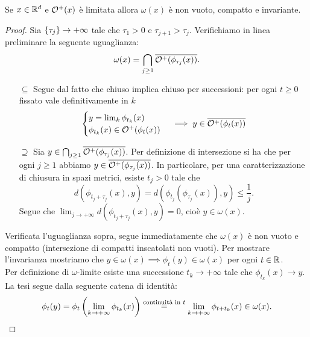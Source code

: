 \begin{proposition}\label{OrbitaPositivaLimitataImplicaCompattezzaEInvarianzaOmegaLimite}
Se $x\in\mathbb{R}^d$ e $\mathcal{O}^+(x)$ \`e limitata allora $\omega(x)$ \`e non vuoto, compatto e invariante.
\end{proposition}
\begin{proof}
Sia $\left\{{\tau_j}\right\}\to+\infty$ tale che $\tau_1>0$ e $\tau_{j+1}>\tau_j$. 
Verifichiamo in linea preliminare la seguente uguaglianza:
\[\omega(x)=\bigcap_{j\geq 1}\overline{\mathcal{O}^+(\phi_{\tau_j}(x))}.\]
\setlength{\leftmargini}{0cm}  
\begin{itemize}
\item[$\boxed{\subseteq}$] Segue dal fatto che chiuso implica chiuso per successioni: per ogni $t\geq 0$ fissato vale definitivamente in $k$
\[\begin{cases}
y=\lim_k\phi_{t_k}(x)\\
\phi_{t_k}(x)\in \mathcal{O}^+(\phi_t(x))
\end{cases}\implies y\in \overline{\mathcal{O}^+(\phi_t(x))}\]
\item[$\boxed{\supseteq}$] Sia $y\in \bigcap_{j\geq 1}\overline{\mathcal{O}^+(\phi_{\tau_j}(x))}$. Per definizione di intersezione si ha che per ogni $j\geq 1$ abbiamo $y\in\overline{\mathcal{O}^+(\phi_{\tau_j}(x))}$. In particolare, per una caratterizzazione di chiusura in spazi metrici, esiste $t_j>0$ tale che
\[d(\phi_{t_j+\tau_j}(x),y)=d(\phi_{t_j}(\phi_{\tau_j}(x)),y)\leq \frac1j.\]
Segue che $\displaystyle\lim_{j\to+\infty}d(\phi_{t_j+\tau_j}(x),y)=0$, cio\`e $y\in \omega(x)$.
\end{itemize}
Verificata l'uguaglianza sopra, segue immediatamente che $\omega(x)$ \`e non vuoto e compatto (intersezione di compatti inscatolati non vuoti). Per mostrare l'invarianza mostriamo che $y\in\omega(x)\implies \phi_t(y)\in\omega(x)$ per ogni $t\in\mathbb{R}$.\\
Per definizione di $\omega$-limite esiste una successione $t_k\to+\infty$ tale che $\phi_{t_k}(x)\to y$. La tesi segue dalla seguente catena di identit\`a:
\[\phi_t(y)=\phi_t\left({\lim_{k\to+\infty}\phi_{t_k}(x)}\right)\overset{\text{continuit\`a in $t$}}=\lim_{k\to+\infty}\phi_{t+t_k}(x)\in\omega(x).\]
\end{proof}

